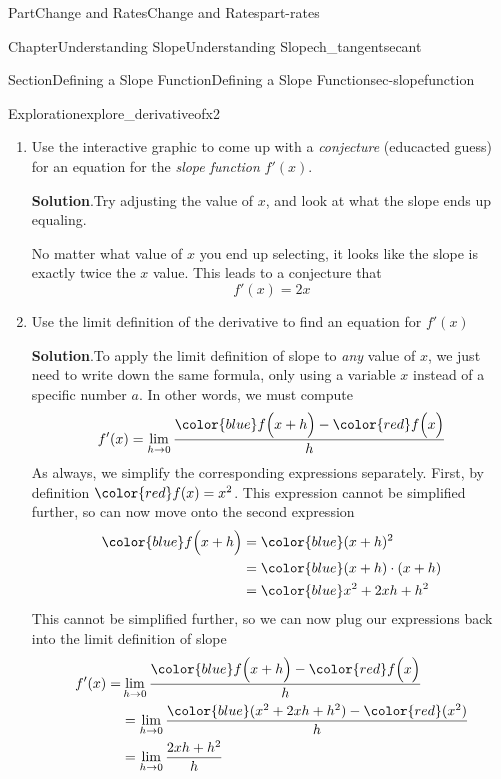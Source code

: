 \documentclass{tufte-book}
\newcommand{\blocktitlefont}{\relax}
\numberwithin{equation}{chapter}
\newcommand{\amp}{&}
\begin{document}
\begin{partptx}{Part}{Change and Rates}{}{Change and Rates}{}{}{part-rates}
\begin{chapterptx}{Chapter}{Understanding Slope}{}{Understanding Slope}{}{}{ch_tangentsecant}
\begin{sectionptx}{Section}{Defining a Slope Function}{}{Defining a Slope Function}{}{}{sec-slopefunction}
\begin{exploration}{Exploration}{}{explore_derivativeofx2}
\begin{enumerate}[font=\bfseries,label=(\alph*),ref=\alph*]
%
\begin{equation*}
f'(1) = 2
\end{equation*}
%
\item{}Use the interactive graphic to come up with a \emph{conjecture} (educacted guess) for an equation for the \emph{slope function} \(f'(x)\).%
\par\smallskip%
\noindent\textbf{\blocktitlefont Solution}.\hypertarget{explore_derivativeofx2-3-2}{}\quad{}Try adjusting the value of \(x\), and look at what the slope ends up equaling.%
\par
No matter what value of \(x\) you end up selecting, it looks like the slope is exactly twice the \(x\) value. This leads to a conjecture that%
\begin{equation*}
f'(x) = 2x
\end{equation*}
%
\item{}Use the limit definition of the derivative to find an equation for \(f'(x)\)%
\par\smallskip%
\noindent\textbf{\blocktitlefont Solution}.\hypertarget{explore_derivativeofx2-4-2}{}\quad{}To apply the limit definition of slope to \emph{any} value of \(x\), we just need to write down the same formula, only using a variable \(x\) instead of a specific number \(a\).  In other words, we must compute%
\begin{equation*}
f'(x) =  \lim_{h\rightarrow 0} \dfrac{{\color{blue} f\Big(x+h\Big)} - {\color{red} f\Big(x\Big)} }{h}
\end{equation*}
As always, we simplify the corresponding expressions separately.  First, by definition \(\color{red} f(x) = x^2\).  This expression cannot be simplified further, so can now move onto the second expression%
\begin{align*}
\color{blue} f\Big(x+h\Big) \amp = \color{blue} (x+h)^2 \\
\amp = \color{blue} (x+h)\cdot (x+h) \\
\amp = \color{blue} x^2 + 2xh + h^2 
\end{align*}
This cannot be simplified further, so we can now plug our expressions back into the limit definition of slope%
\begin{align*}
f'(x) = \amp \lim_{h\rightarrow 0} \dfrac{{\color{blue} f\Big(x+h\Big)} - {\color{red} f\Big(x\Big)} }{h} \\
\amp =  \lim_{h\rightarrow 0}\dfrac{  {\color{blue} (x^2 + 2xh + h^2)} - {\color{red} (x^2)}  }{h}\\
\amp =  \lim_{h\rightarrow 0}\dfrac{  2xh + h^2  }{h} \\

\end{align*}
\end{enumerate}
\end{exploration}
\end{sectionptx}
\end{chapterptx}
\end{partptx}
\end{document}
